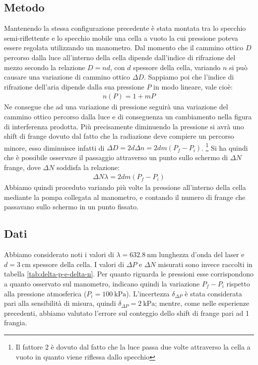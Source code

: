 \documentclass[a4paper]{article}
\begin{document}
\subsection{Metodo}
Mantenendo la stessa configurazione precedente è stata montata tra lo specchio semi-riflettente e lo specchio mobile una cella a vuoto la cui pressione poteva essere regolata utilizzando un manometro. Dal momento che il cammino ottico $D$ percorso dalla luce all'interno della cella dipende dall'indice di rifrazione del mezzo secondo la relazione $D=nd$, con $d$ spessore della cella, variando $n$ si può causare una variazione di cammino ottico $\Delta D$. Sappiamo poi che l'indice di rifrazione dell'aria dipende dalla sua pressione $P$ in modo lineare, vale cioè: 
\begin{align}
    n(P) = 1 + mP 
\end{align}
Ne consegue che ad una variazione di pressione seguirà una variazione del cammino ottico percorso dalla luce e di conseguenza un cambiamento nella figura di interferenza prodotta. Più precisamente diminuendo la pressione si avrà uno shift di frange dovuto dal fatto che la radiazione deve compiere un percorso minore, esso diminuisce infatti di $\Delta D= 2d \Delta n= 2dm(P_f-P_i)$. \footnote{Il fattore 2 è dovuto dal fatto che la luce passa due volte attraverso la cella a vuoto in quanto viene riflessa dallo specchio} 
Si ha quindi che è possibile osservare il passaggio attraverso un punto sullo schermo di $\Delta N$ frange, dove $\Delta N$ soddisfa la relazione:
\begin{align}
    \Delta N \lambda= 2dm(P_f-P_i)
\label{eq:shift-frange-pressione-aria}
\end{align}
Abbiamo quindi proceduto variando più volte la pressione all'interno della cella mediante la pompa collegata al manometro, e contando il numero di frange che passavano sullo schermo in un punto fissato.

\subsection{Dati}
Abbiamo considerato noti i valori di $\lambda=\SI{632.8}{\nano\meter}$ lunghezza d'onda del laser e $d=\SI{3}{\centi\meter}$ spessore della cella. I valori di $\Delta P$ e $\Delta N$ misurati sono invece raccolti in tabella \ref{tab:delta-p-e-delta-n}. Per quanto riguarda le pressioni esse corrispondono a quanto osservato sul manometro, indicano quindi la variazione $P_f- P_i$ rispetto alla pressione atmosferica ($P_i = \SI{100}{\kilo\pascal}$). L'incertezza $\delta_{\Delta P}$ è stata considerata pari alla sensibilità di misura, quindi $\delta_{\Delta P}=\SI{2}{\kilo\pascal}$; mentre, come nelle esperienze precedenti, abbiamo valutato l'errore sul conteggio dello shift di frange pari ad 1 frangia.
\end{document}
